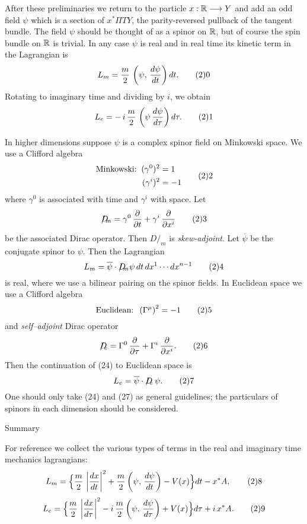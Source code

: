 After these preliminaries we return to the particle $x:\Bbb R\longrightarrow
Y$ and add an odd field $\psi$ which is a section of $x^*\Pi TY$, the
parity-reversed pullback of the tangent bundle.  The field $\psi$ should be
thought of as a spinor on $\Bbb R$, but of course the spin bundle on $\Bbb R$
is trivial.  In any case $\psi$ is real and in real time its kinetic term in
the Lagrangian is
$$
L_m=\frac{m}{2}\,\left(\psi,\,\frac{d\psi}{dt}\right)dt.\tag20
$$
Rotating to imaginary time and dividing by $i$, we obtain
$$
L_e=-\,i\,\frac{m}{2}\,\left(\psi\,
\frac{d\psi}{d\tau}\right)d\tau.\tag21
$$
 
In higher dimensions suppose $\psi$ is a complex spinor
field on Minkowski space.  We use a Clifford algebra
$$
\aligned
\text{Minkowski:\;\;}(\gamma^0)^2&=1\\
(\gamma^i)^2&=-1
\endaligned\tag22
$$
where $\gamma^0$ is associated with time and $\gamma^i$
with space.  Let
$$
D\!\!\!\!\!\slash_m=\gamma^0\,\frac{\partial}{\partial
t}+\gamma^i\,\frac{\partial}{\partial x^i}\tag23
$$
be the associated Dirac operator.  Then $D\!\!\!\!\!\slash_m$
is {\it skew-adjoint}.  Let $\overline\psi$ be the
conjugate spinor to $\psi$.  Then the Lagrangian
$$
L_m=\overline\psi\cdot D\!\!\!\!\!\slash_m\psi\,dt\,dx^1\cdots dx^{n-1}\tag24
$$
is real, where we use a bilinear pairing on the spinor fields.  In Euclidean
space we use a Clifford algebra
$$
\text{Euclidean:\;\;}\left(\Gamma^\mu\right)^2=-1\tag25
$$
and {\it self--adjoint} Dirac operator
$$
D\!\!\!\!\!\slash_e=\Gamma^0\,\frac{\partial}{\partial\tau}
+\Gamma^i\,\frac{\partial}{\partial x^i}.\tag26
$$
Then the continuation of (24) to Euclidean space is
$$
L_e=\overline\psi\cdot D\!\!\!\!\!\slash_e\,\psi.\tag27
$$
One should only take (24) and (27) as general guidelines;
the particulars of spinors in each dimension should be
considered.
 
\subhead Summary\endsubhead
 
For reference we collect the various types of terms in the
real and imaginary time mechanics lagrangians:
$$
L_m=\Big\{\frac{m}{2}\,\,\bigg\vert\frac{dx}{dt}\bigg\vert^2+
\frac{m}{2}\left(\psi,\,\frac{d\psi}{dt}\right)-V(x)\Big\}
dt-x^*A,\tag28
$$
$$
L_e=\Big\{\frac{m}{2}\,\,\bigg\vert\frac{dx}{d\tau}\bigg\vert
^2
-i\,\frac{m}{2}\left(\psi,\,\frac{d\psi}{d\tau}\right)+V(x)
\Big\}d\tau+i\,x^*A.\tag29
$$




\enddocument
